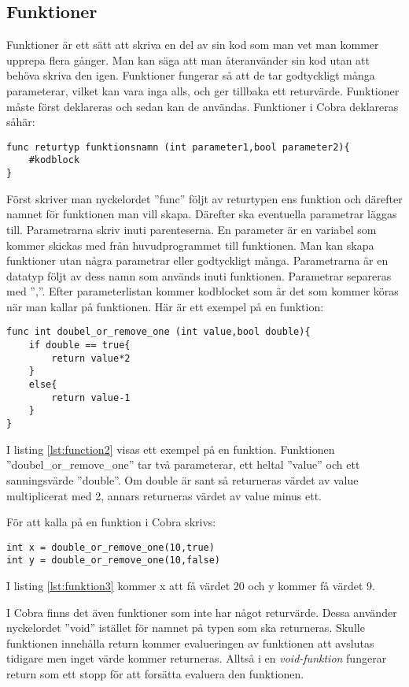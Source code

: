 \documentclass{TDP003mall}
\begin{document}
\subsection{Funktioner}
Funktioner är ett sätt att skriva en del av sin kod som man vet man kommer upprepa flera gånger.
Man kan säga att man återanvänder sin kod utan att behöva skriva den igen. 
Funktioner fungerar så att de tar godtyckligt många parameterar, vilket kan vara inga alls, och ger tillbaka ett returvärde. Funktioner måste först deklareras och sedan kan de användas. Funktioner i Cobra deklareras såhär:
\begin{lstlisting}[caption=Funktions-exempel, label=lst:function1]
func returtyp funktionsnamn (int parameter1,bool parameter2){
    #kodblock
}
\end{lstlisting}
Först skriver man nyckelordet ''func'' följt av returtypen ens funktion och därefter namnet för funktionen man vill skapa. 
Därefter ska eventuella parametrar läggas till. 
Parametrarna skriv inuti parenteserna.
En parameter är en variabel som kommer skickas med från huvudprogrammet till funktionen.
Man kan skapa funktioner utan några parametrar eller godtyckligt många. 
Parametrarna är en datatyp följt av dess namn som används inuti funktionen. 
Parametrar separeras med '',''. 
Efter parameterlistan kommer kodblocket som är det som kommer köras när man kallar på funktionen. Här är ett exempel på en funktion:
\begin{lstlisting}[caption=Funktions-exempel 2, label=lst:function2]
func int doubel_or_remove_one (int value,bool double){
    if double == true{
        return value*2
    }
    else{
        return value-1
    }
}
\end{lstlisting}
I listing \ref{lst:function2} visas ett exempel på en funktion. Funktionen ''doubel\_or\_remove\_one'' tar två parameterar, ett heltal ''value'' och ett sanningsvärde ''double''. Om double är sant så returneras värdet av value multiplicerat med 2, annars returneras värdet av value minus ett.

För att kalla på en funktion i Cobra skrivs:
\begin{lstlisting}[caption=Funktions-exempel 3, label=lst:funktion3]
int x = double_or_remove_one(10,true)
int y = double_or_remove_one(10,false)
\end{lstlisting}
I listing \ref{lst:funktion3} kommer x att få värdet 20 och y kommer få värdet 9.

I Cobra finns det även funktioner som inte har något returvärde. 
Dessa använder nyckelordet ''void'' istället för namnet på typen som ska returneras. 
Skulle funktionen innehålla return kommer evalueringen av funktionen att avslutas tidigare men inget värde kommer returneras.
Alltså i en \emph{void-funktion} fungerar return som ett stopp för att forsätta evaluera den funktionen.
\end{document}
